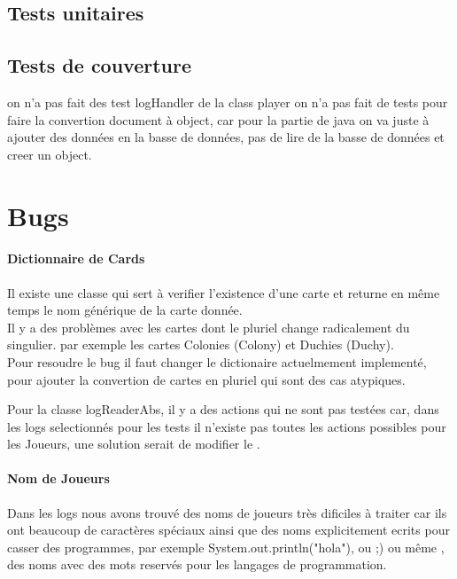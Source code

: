 \subsection{Tests unitaires}



\subsection{Tests de couverture}

on n'a pas fait des test logHandler
de la class player on n'a pas fait de tests pour faire la convertion document à object, car pour la partie de java on va juste à ajouter des données en la basse de données, pas de lire de la basse de données et creer un object.


\section{Bugs}

\paragraph*{Dictionnaire de Cards} 

Il existe une classe qui sert à verifier l'existence d'une carte et returne en même temps le nom générique de la carte donnée.\\
Il y a des problèmes avec les cartes dont le pluriel change radicalement du singulier. par exemple les cartes Colonies (Colony) et Duchies (Duchy). \\

Pour resoudre le bug il faut changer le dictionaire actuelmement implementé, pour ajouter la convertion de cartes en pluriel qui sont des cas atypiques.

Pour la classe logReaderAbs, il y a des actions qui ne sont pas testées car, dans les logs selectionnés pour les tests il n'existe pas toutes les actions possibles pour les Joueurs, une solution serait de modifier le .

\paragraph*{Nom de Joueurs} 

Dans les logs nous avons trouvé des noms de joueurs très dificiles à traiter car ils ont beaucoup de caractères spéciaux ainsi que des noms explicitement ecrits pour casser des programmes,
par exemple System.out.println("hola"), ou ;) ou même , des noms avec des mots reservés pour les langages de programmation.


